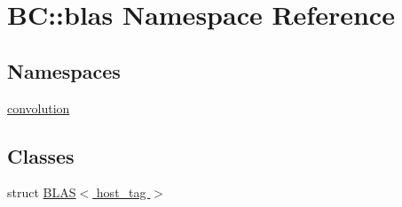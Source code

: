 \hypertarget{namespaceBC_1_1blas}{}\section{BC\+:\+:blas Namespace Reference}
\label{namespaceBC_1_1blas}
\subsection*{Namespaces}
\begin{DoxyCompactItemize}
\item 
 \hyperlink{namespaceBC_1_1blas_1_1convolution}{convolution}
\end{DoxyCompactItemize}
\subsection*{Classes}
\begin{DoxyCompactItemize}
\item 
struct \hyperlink{structBC_1_1blas_1_1BLAS_3_01host__tag_01_4}{B\+L\+A\+S$<$ host\+\_\+tag $>$}
\end{DoxyCompactItemize}
